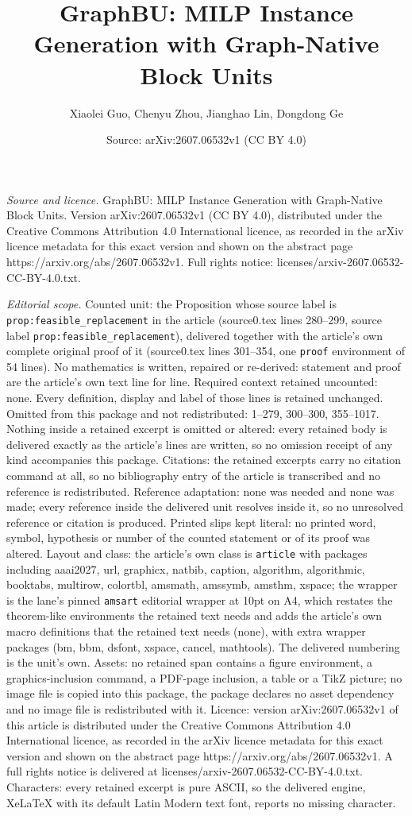 \documentclass[10pt,a4paper]{amsart}
\title[GraphBU: MILP Instance Generation with Graph-Native Block Un]{GraphBU: MILP Instance Generation with Graph-Native Block Units}
\author{Xiaolei Guo, Chenyu Zhou, Jianghao Lin, Dongdong Ge}
\date{Source: arXiv:2607.06532v1 (CC BY 4.0)}
\begin{document}
\maketitle

\noindent\emph{Source and licence.} GraphBU: MILP Instance Generation with Graph-Native Block Units. Version arXiv:2607.06532v1 (CC BY 4.0), distributed under the Creative Commons Attribution 4.0 International licence, as recorded in the arXiv licence metadata for this exact version and shown on the abstract page https://arxiv.org/abs/2607.06532v1. Full rights notice: licenses/arxiv-2607.06532-CC-BY-4.0.txt.\par\smallskip

\noindent\textit{Editorial scope.} Counted unit: the Proposition whose source label is \texttt{prop:feasible\_replacement} in the article (source0.tex lines 280--299, source label \texttt{prop:feasible\_replacement}), delivered together with the article's own complete original proof of it (source0.tex lines 301--354, one \texttt{proof} environment of 54 lines). No mathematics is written, repaired or re-derived: statement and proof are the article's own text line for line. Required context retained uncounted: none. Every definition, display and label of those lines is retained unchanged. Omitted from this package and not redistributed: 1--279, 300--300, 355--1017. Nothing inside a retained excerpt is omitted or altered: every retained body is delivered exactly as the article's lines are written, so no omission receipt of any kind accompanies this package. Citations: the retained excerpts carry no citation command at all, so no bibliography entry of the article is transcribed and no reference is redistributed. Reference adaptation: none was needed and none was made; every reference inside the delivered unit resolves inside it, so no unresolved reference or citation is produced. Printed slips kept literal: no printed word, symbol, hypothesis or number of the counted statement or of its proof was altered. Layout and class: the article's own class is \texttt{article} with packages including aaai2027, url, graphicx, natbib, caption, algorithm, algorithmic, booktabs, multirow, colortbl, amsmath, amssymb, amsthm, xspace; the wrapper is the lane's pinned \texttt{amsart} editorial wrapper at 10pt on A4, which restates the theorem-like environments the retained text needs and adds the article's own macro definitions that the retained text needs (none), with extra wrapper packages (bm, bbm, dsfont, xspace, cancel, mathtools). The delivered numbering is the unit's own. Assets: no retained span contains a figure environment, a graphics-inclusion command, a PDF-page inclusion, a table or a TikZ picture; no image file is copied into this package, the package declares no asset dependency and no image file is redistributed with it. Licence: version arXiv:2607.06532v1 of this article is distributed under the Creative Commons Attribution 4.0 International licence, as recorded in the arXiv licence metadata for this exact version and shown on the abstract page https://arxiv.org/abs/2607.06532v1. A full rights notice is delivered at licenses/arxiv-2607.06532-CC-BY-4.0.txt. Characters: every retained excerpt is pure ASCII, so the delivered engine, XeLaTeX with its default Latin Modern text font, reports no missing character.
\end{document}

